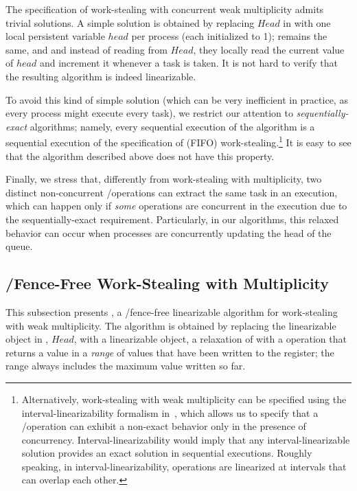 The specification of work-stealing with concurrent weak multiplicity admits trivial solutions. A simple solution is obtained by replacing \(Head\) in \WFWSM with one local persistent variable \(head\) per process (each initialized to 1); \Put remains the same, and \Take and \Steal instead of reading from \(Head\), they locally read the current value of \(head\) and increment it whenever a task is taken. It is not hard to verify that the resulting algorithm is indeed linearizable.

\begin{remark}
To avoid this kind of simple solution (which can be very inefficient in practice, as every process might execute every task), we restrict our attention to \textit{sequentially-exact} algorithms; namely, every sequential execution of the algorithm is a sequential execution of the specification of (FIFO) work-stealing.\footnote{Alternatively, work-stealing with weak multiplicity can be specified using the interval-linearizability formalism in~\cite{DBLP_journals_jacm_CastanedaRR18}, which allows us to specify that a \Take/\Steal operation can exhibit a non-exact behavior only in the presence of concurrency. Interval-linearizability would imply that any interval-linearizable solution provides an exact solution in sequential executions. Roughly speaking, in interval-linearizability, operations are linearized at intervals that can overlap each other.}  It is easy to see that the algorithm described above does not have this property.
\end{remark}

Finally, we stress that, differently from work-stealing with multiplicity, two distinct non-concurrent \Take/\Steal operations can extract the same task in an execution, which can happen only if \emph{some} operations are concurrent in the execution due to the sequentially-exact requirement. Particularly, in our algorithms, this relaxed behavior can occur when processes are concurrently updating the head of the queue.


\subsection{\label{sec-ws-mult-read-write}\R/\W Fence-Free Work-Stealing with Multiplicity}


This subsection presents \NCWSM, a \R/\W fence-free linearizable algorithm for work-stealing with weak multiplicity. The algorithm is obtained by replacing the linearizable \MaxReg object in \WFWSM, $Head$, with a linearizable \RangeMaxReg object, a relaxation of \MaxReg with a \RMaxR operation that returns a value in a \emph{range} of values that have been written to the register; the range always includes the maximum value written so far.

